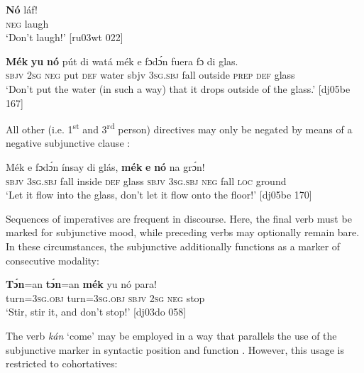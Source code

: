 \ea%
    \label{ex:key:433}
    \gll \textbf{Nó} láf!\\
\textsc{neg}  laugh\\

\glt ‘Don’t laugh!’ [ru03wt 022]
\z


\ea%
    \label{ex:key:434}
    \gll \textbf{Mék}    \textbf{yu}  \textbf{nó}  pút  di  watá  mék    e    fɔdɔ́n
fuera  fɔ  di  glas.\\
\textsc{sbjv}    \textsc{2sg}  \textsc{neg}  put  \textsc{def}  water  sbjv    \textsc{3sg.sbj}  fall
outside  \textsc{prep}  \textsc{def}  glass\\

\glt ‘Don’t put the water (in such a way) that it drops outside 
of the glass.’ [dj05be 167]
\z

All other (i.e. 1\textsuperscript{st} and 3\textsuperscript{rd} person) directives may only be negated by means of a negative subjunctive clause :


\ea%
    \label{ex:key:435}
    \gll Mék    e    fɔdɔ́n  ínsay  di  glás,    \textbf{mék} \textbf{e}
\textbf{nó}   na  grɔ́n!\\
\textsc{sbjv}    \textsc{3sg.sbj}  fall    inside  \textsc{def}  glass  \textsc{sbjv}    \textsc{3sg.sbj}
\textsc{neg}  fall    \textsc{loc}  ground\\

\glt ‘Let it flow into the glass, don’t let it flow onto the floor!’ [dj05be 170]
\z

Sequences of imperatives are frequent in discourse. Here, the final verb must be marked for subjunctive mood, while preceding verbs may optionally remain bare. In these circumstances, the subjunctive additionally functions as a marker of consecutive modality: 


\ea%
    \label{ex:key:436}
    \gll \textbf{Tɔ́n}=an    \textbf{tɔ́n}=an    \textbf{mék} yu  nó  para!\\
turn=\textsc{3sg.obj}  turn=\textsc{3sg.obj}  \textsc{sbjv}    \textsc{2sg}  \textsc{neg}  stop\\

\glt ‘Stir, stir it, and don’t stop!’ [dj03do 058]
\z

The verb \textit{kán} ‘come’  may be employed in a way that parallels the use of the subjunctive marker in syntactic position and function . However, this usage is restricted to cohortatives:


